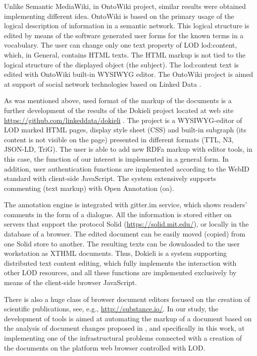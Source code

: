 \documentclass[12pt]{llncs}
\begin{document}
Unlike Semantic MediaWiki, in OntoWiki project, similar results were obtained implementing different idea. OntoWiki is based on the primary usage of the logical description of information in a semantic network. This logical structure is edited by means of the software generated user forms for the known terms in a vocabulary. The user can change only one text property of LOD lod:content, which, in General, contains HTML texts. The HTML markup is not tied to the logical structure of the displayed object (the subject). The lod:content text is edited with OntoWiki built-in WYSIWYG editor. The OntoWiki project is aimed at support of social network technologies based on Linked Data \cite{b6}.

As was mentioned above, used format of the markup of the documents is a further development of the results of the Dokieli project located at web site \url{https://github.com/linkeddata/dokieli} \cite{b14}. The project is a WYSIWYG-editor of LOD marked HTML pages, display style sheet (CSS) and built-in subgraph (its content is not visible on the page) presented in different formats (TTL, N3, JSON-LD, TriG). The user is able to add new RDFa markup with editor tools, in this case, the function of our interest is implemented in a general form. In addition, user authentication functions are implemented according to the WebID standard with client-side JavaScript. The system extensively supports commenting (text markup) with Open Annotation (oa).

The annotation engine is integrated with gitter.im service, which shows readers' comments in the form of a dialogue. All the information is stored either on servers that support the protocol Solid (\url{https://solid.mit.edu/}), or locally in the database of a browser. The edited document can be easily moved (copied) from one Solid store to another. The resulting texts can be downloaded to the user workstation as XTHML documents. Thus, Dokieli is a system supporting distributed text content editing, which fully implements the interaction with other LOD resources, and all these functions are implemented exclusively by means of the client-side browser JavaScript.

There is also a huge class of browser document editors focused on the creation of scientific publications, see, e.g., \url{http://substance.io/}. In our study, the development of tools is aimed at automating the markup of a document based on the analysis of document changes proposed in \cite{b14}, and specifically in this work, at implementing one of the infrastructural problems connected with a creation of the documents on the platform web browser controlled with LOD.
\end{document}
